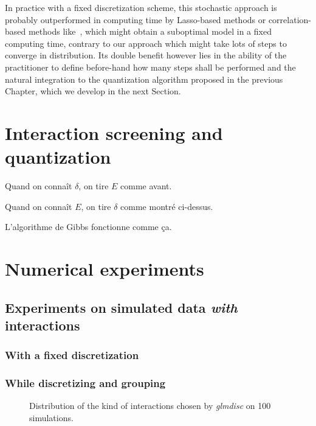 In practice with a fixed discretization scheme, this stochastic approach is probably outperformed in computing time by Lasso-based methods or correlation-based methods like~\cite{simon}, which might obtain a suboptimal model in a fixed computing time, contrary to our approach which might take lots of steps to converge in distribution. Its double benefit however lies in the ability of the practitioner to define before-hand how many steps shall be performed and the natural integration to the quantization algorithm proposed in the previous Chapter, which we develop in the next Section.

\section{Interaction screening and quantization}

Quand on connaît $\delta$, on tire $E$ comme avant.

Quand on connaît $E$, on tire $\delta$ comme montré ci-dessus.

L'algorithme de Gibbs fonctionne comme ça.



\section{Numerical experiments}


\subsection{Experiments on simulated data \textit{with} interactions}

\subsubsection{With a fixed discretization}





\subsubsection{While discretizing and grouping}

\begin{figure}
\centering
\resizebox{\linewidth}{6cm}{%

}
\caption{\label{fig:simulated_interaction}Distribution of the kind of interactions chosen by \textit{glmdisc} on 100 simulations.}
\end{figure}





